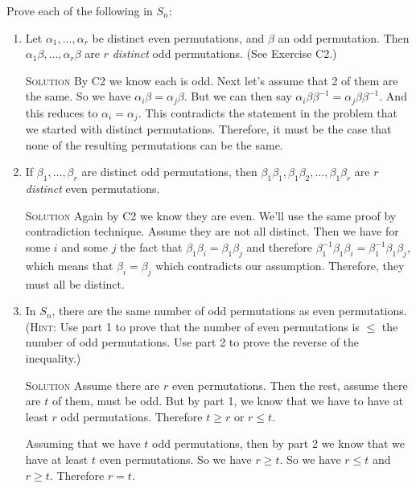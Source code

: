 \documentclass[twoside]{amsart}
\newcommand{\solution}{\textsc{Solution}\xspace}
\begin{document}
\begin{enumerate}[A.]
   Prove each of the following in $S_n$:
   \begin{enumerate}[1]
       \item Let $\alpha_1,\ldots,\alpha_r$ be distinct even
       permutations, and $\beta$ an odd permutation. Then
       $\alpha_1\beta,\ldots,\alpha_r\beta$ are $r$ \emph{distinct}
       odd permutations. (See Exercise C2.)

       \noindent \solution By C2 we know each is odd. Next let's assume
       that 2 of them are the same. So we have $\alpha_i\beta
       = \alpha_j\beta$. But we can then say $\alpha_i\beta\beta^{-1}
       = \alpha_j\beta\beta^{-1}$. And this reduces to $\alpha_i=\alpha_j$.
       This contradicts the statement in the problem that
       we started with distinct permutations. Therefore, it must
       be the case that none of the resulting permutations can be the
       same.

       \item If $\beta_1,\ldots,\beta_r$ are distinct odd permutations,
       then $\beta_1\beta_1, \beta_1\beta_2, \ldots, \beta_1\beta_r$ are
       $r$ \emph{distinct} even permutations.

       \noindent \solution Again by C2 we know they are even. We'll use
       the same proof by contradiction technique. Assume they are not
       all distinct. Then we have for some $i$ and some $j$ the fact
       that $\beta_1\beta_i=\beta_1\beta_j$ and therefore
       $\beta_1^{-1}\beta_1\beta_i=\beta_1^{-1}\beta_1\beta_j$, which
       means that $\beta_i=\beta_j$ which contradicts our assumption.
       Therefore, they must all be distinct.

       \item In $S_n$, there are the same number of odd permutations as even
       permutations. (\textsc{Hint}: Use part 1 to prove that the number of
       even permutations is $\le$ the number of odd permutations.
       Use part 2 to prove the reverse of the inequality.)

       \noindent \solution Assume there are $r$ even permutations. Then the
       rest, assume there are $t$ of them, must be odd. But by part 1, we know
       that we have to have at least $r$ odd permutations. 
       Therefore $t \ge r$ or  $r \le t$.

       Assuming that we have $t$ odd permutations, then by part 2
       we know that we have at least $t$ even permutations. So we
       have $r \ge t$. So we have $r \le t$ and $r \ge t$. Therefore $r=t$.


\end{enumerate}
\end{enumerate}
\end{document}
